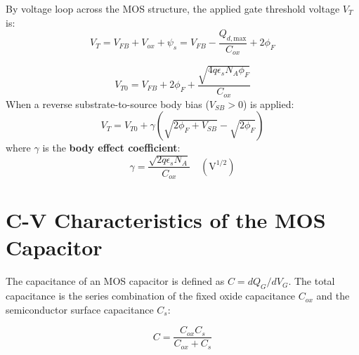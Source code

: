 \documentclass[12pt,a4paper]{article}
\begin{document}
By voltage loop across the MOS structure, the applied gate threshold voltage $V_T$ is:
\begin{equation}
  V_T = V_{FB} + V_{ox} + \psi_s = V_{FB} - \frac{Q_{d,\text{max}}}{C_{ox}} + 2\phi_F
\end{equation}

\begin{tcolorbox}[formulabox, title={\textbf{Threshold Voltage and Body Effect Equations}}]
\begin{equation}
  V_{T0} = V_{FB} + 2\phi_F + \frac{\sqrt{4 q \epsilon_s N_A \phi_F}}{C_{ox}}
\end{equation}
When a reverse substrate-to-source body bias ($V_{SB} > 0$) is applied:
\begin{equation}
  V_T = V_{T0} + \gamma \left(\sqrt{2\phi_F + V_{SB}} - \sqrt{2\phi_F}\right)
\end{equation}
where $\gamma$ is the \textbf{body effect coefficient}:
\begin{equation}
  \gamma = \frac{\sqrt{2 q \epsilon_s N_A}}{C_{ox}} \quad (\text{V}^{1/2})
\end{equation}
\end{tcolorbox}

\section{C-V Characteristics of the MOS Capacitor}

The capacitance of an MOS capacitor is defined as $C = dQ_G / dV_G$. The total capacitance is the series combination of the fixed oxide capacitance $C_{ox}$ and the semiconductor surface capacitance $C_s$:

\begin{equation}
  C = \frac{C_{ox} C_s}{C_{ox} + C_s}
\end{equation}
\end{document}
